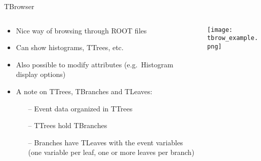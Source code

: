 \documentclass[10pt, aspectratio=169]{beamer}
\begin{document}
\begin{frame}{TBrowser}
  \begin{columns}
    \begin{column}{0.49\textwidth}
  \begin{itemize}
    \item
      Nice way of browsing through ROOT files
    \item
      Can show histograms, TTrees, etc.
    \item
      Also possible to modify attributes (e.g.~Histogram display options)
    \item
      A note on TTrees, TBranches and TLeaves:
    \begin{itemize}
      \item[--]
        Event data organized in TTrees
      \item[--]
        TTrees hold TBranches
      \item[--]
        Branches have TLeaves with the event variables (one variable per leaf, one or more leaves per branch)
    \end{itemize}
  \end{itemize}
    \end{column}
    \hfill
    \begin{column}{0.49\textwidth}
      \texttt{[image: tbrow\_example.png]}
    \end{column}
  \end{columns}
\end{frame}
\end{document}
